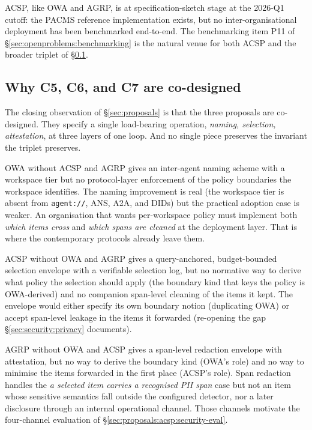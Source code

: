 ACSP, like OWA and AGRP, is at specification-sketch
stage at the 2026-Q1 cutoff: the PACMS reference
implementation exists, but no inter-organisational
deployment has been benchmarked end-to-end. The
benchmarking item P11 of
\S\ref{sec:openproblems:benchmarking} is the natural
venue for both ACSP and the broader triplet of
\S\ref{sec:proposals:codesign}.

\subsection{Why C5, C6, and C7 are co-designed}
\label{sec:proposals:codesign}

The closing observation of \S\ref{sec:proposals} is that
the three proposals are co-designed. They specify a
single load-bearing operation, \emph{naming, selection,
attestation}, at three layers of one loop. And no single
piece preserves the invariant the triplet
preserves.

OWA without ACSP and AGRP gives an inter-agent naming
scheme with a workspace tier but no protocol-layer
enforcement of the policy boundaries the workspace
identifies. The naming improvement is real (the
workspace tier is absent from \texttt{agent://}, ANS,
A2A, and DIDs) but the practical adoption case is weaker.
An organisation that wants per-workspace policy must
implement both \emph{which items cross} and \emph{which
spans are cleaned} at the deployment layer. That is
where the contemporary protocols already leave them.

ACSP without OWA and AGRP gives a query-anchored,
budget-bounded selection envelope with a verifiable
selection log, but no normative way to derive what
policy the selection should apply (the boundary kind
that keys the policy is OWA-derived) and no companion
span-level cleaning of the items it kept. The envelope
would either specify its own boundary notion (duplicating
OWA) or accept span-level leakage in the items it
forwarded (re-opening the gap
\S\ref{sec:security:privacy} documents).

AGRP without OWA and ACSP gives a span-level redaction
envelope with attestation, but no way to derive the
boundary kind (OWA's role) and no way to minimise the
items forwarded in the first place (ACSP's role). Span
redaction handles the \emph{a selected item carries a
recognised PII span} case but not an item whose sensitive
semantics fall outside the configured detector, nor a
later disclosure through an internal operational channel.
Those channels motivate the four-channel evaluation of
\S\ref{sec:proposals:acsp:security-eval}.

